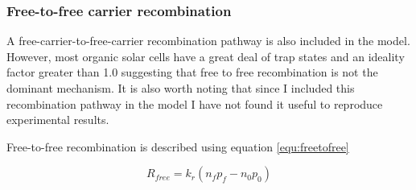 \subsubsection{Free-to-free carrier recombination}
A free-carrier-to-free-carrier recombination pathway is also included in the model. However, most organic solar cells have a great deal of trap states and an ideality factor greater than 1.0 suggesting that free to free recombination is not the dominant mechanism.  It is also worth noting that since I included this recombination pathway in the model I have not found it useful to reproduce experimental results.

Free-to-free recombination is described using equation \ref{equ:freetofree}

\begin{equation}
R_{free}=k_{r}(n_{f}p_{f}-n_{0}p_{0})
\label{equ:freetofree}
\end{equation}


